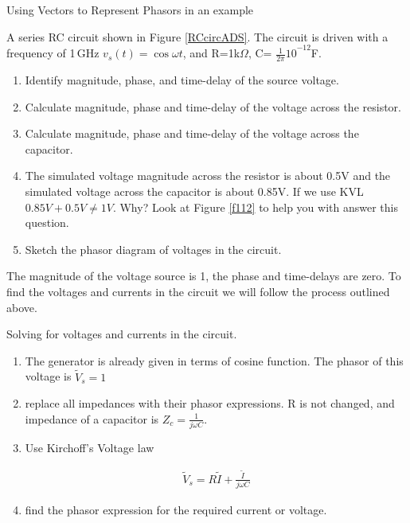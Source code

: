 \documentclass{ximera}
\begin{document}
\begin{example}
Using Vectors to Represent Phasors in an example

A series RC circuit shown in Figure \ref{RCcircADS}. The circuit is driven with a frequency of 1\,GHz $v_s(t)=  \cos \omega t$, and R=1k$\Omega $, C= ${\frac{1}{2\pi }10}^{-12}$F. 
 


\begin{enumerate}
\item  Identify magnitude, phase, and time-delay  of the source voltage.

\item  Calculate magnitude, phase and time-delay of the voltage across the resistor.

\item  Calculate magnitude, phase and time-delay of the voltage across the capacitor.

\item  The simulated voltage magnitude across the resistor is about 0.5V and the simulated voltage across the capacitor is about 0.85V.  If we use KVL $ 0.85V+0.5V \neq 1V$. Why? Look at Figure \ref{f112} to help you with answer this question.

\item Sketch the phasor diagram of voltages in the circuit. 

\end{enumerate}

\begin{explanation} 
The magnitude of the voltage source is 1, the phase and time-delays are zero. To find the voltages and currents in the circuit we will follow the process outlined above.

Solving for voltages and currents in the circuit.
 \begin{enumerate}
\item The generator is already given in terms of cosine function. The phasor of this voltage is $\tilde{V}_s= 1$ 
\item replace all impedances with their phasor expressions. R is not changed, and impedance of a capacitor is $Z_c=\frac{1}{j \omega C}$.
\item  Use Kirchoff's Voltage law 

\begin{eqnarray}
\tilde{V}_s  = R \tilde{I}    + \frac{\tilde{I}}{j \omega C}  
\end{eqnarray}

\item find the phasor expression for the required current or voltage. 


\end{enumerate}
\end{explanation}
\end{example}
\end{document}
